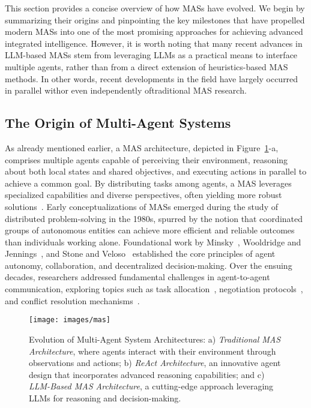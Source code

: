 This section provides a concise overview of how MASs have evolved. We begin by summarizing their origins and pinpointing the key milestones that have propelled modern MASs into one of the most promising approaches for achieving advanced integrated intelligence. However, it is worth noting that many recent advances in LLM-based MASs stem from leveraging LLMs as a practical means to interface multiple agents, rather than from a direct extension of heuristics-based MAS methods. In other words, recent developments in the field have largely occurred in parallel with\textemdash or even independently of\textemdash traditional MAS research.

\subsection{The Origin of Multi-Agent Systems}
As already mentioned earlier, a MAS architecture, depicted in Figure~\ref{fig:mas-architecture}-a, comprises multiple agents capable of perceiving their environment, reasoning about both local states and shared objectives, and executing actions in parallel to achieve a common goal. By distributing tasks among agents, a MAS leverages specialized capabilities and diverse perspectives, often yielding more robust solutions~\cite{durfee1999distributed}. Early conceptualizations of MASs emerged during the study of distributed problem-solving in the 1980s, spurred by the notion that coordinated groups of autonomous entities can achieve more efficient and reliable outcomes than individuals working alone. Foundational work by Minsky~\cite{minsky1988society}, Wooldridge and Jennings~\cite{wooldridge1995intelligent}, and Stone and Veloso~\cite{stone2000multiagent} established the core principles of agent autonomy, collaboration, and decentralized decision-making. Over the ensuing decades, researchers addressed fundamental challenges in agent-to-agent communication, exploring topics such as task allocation~\cite{sandholm1998contract}, negotiation protocols~\cite{jennings2001automated,shoham1997emergence}, and conflict resolution mechanisms~\cite{rosenschein1994rules}.

\begin{figure}[h]
    \centering
    \texttt{[image: images/mas]}
    \caption{Evolution of Multi-Agent System Architectures: a) {\em Traditional MAS Architecture}, where agents interact with their environment through observations and actions; b) {\em ReAct Architecture}, an innovative agent design that incorporates advanced reasoning capabilities; and c) {\em LLM-Based MAS Architecture}, a cutting-edge approach leveraging LLMs for reasoning and decision-making.}
    \label{fig:mas-architecture}
\end{figure}

